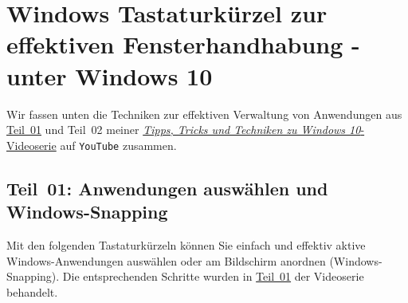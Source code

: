 \documentclass[11pt,a4paper]{scrartcl}
\begin{document}
%
\section*{Windows Tastaturkürzel zur effektiven Fensterhandhabung
-  unter Windows 10}
Wir fassen unten die Techniken zur effektiven Verwaltung von Anwendungen aus \href{https://youtu.be/wjzZGac1yso}{Teil~01} und Teil~02 meiner \href{https://youtube.com/playlist?list=PL0FqMC_xCtjQCsFwN8ci8bJhci5xMx1Bm}{\emph{Tipps, Tricks und Techniken zu Windows 10}-Videoserie} auf \texttt{YouTube} zusammen.
%
\subsection*{Teil~01: Anwendungen auswählen und Windows-Snapping}
\label{subsec:windows_snapping}
%
Mit den folgenden Tastaturkürzeln können Sie einfach und effektiv
aktive Windows-Anwendungen auswählen oder am Bildschirm anordnen
(Windows-Snapping). Die entsprechenden Schritte wurden in
\href{https://youtu.be/wjzZGac1yso}{Teil~01} der Videoserie behandelt.
%
\end{document}
